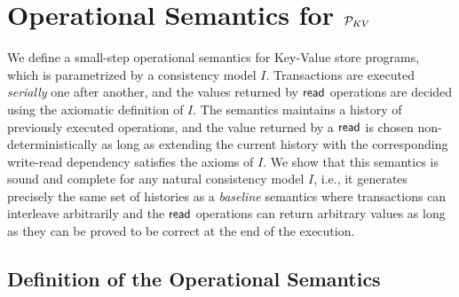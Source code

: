 
\section{Operational Semantics for $\mathcal{P}_{KV}$}
\label{sec:op-kv}

We define a small-step operational semantics for Key-Value store programs, which is parametrized by a consistency model $I$. Transactions are executed \emph{serially} one after another, and the values returned by $\textsf{read}$ operations are decided using the axiomatic definition of $I$. The semantics maintains a history of previously executed operations, and the value returned by a $\textsf{read}$ is chosen non-deterministically as long as extending the current history with the corresponding write-read dependency satisfies the axioms of $I$. 
We show that this semantics is sound and complete for any natural consistency model $I$, i.e., it generates precisely the same set of histories as a \emph{baseline} semantics where transactions can interleave arbitrarily and the $\textsf{read}$ operations can return arbitrary values as long as they can be proved to be correct at the end of the execution.

\subsection{Definition of the Operational Semantics}

